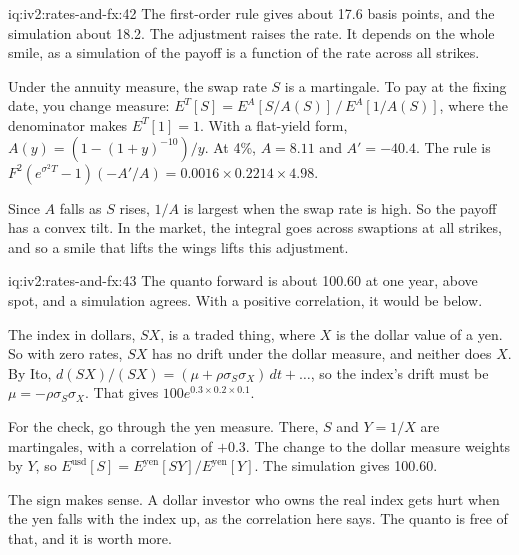 \begin{solution}{iq:iv2:rates-and-fx:42}
The first-order rule gives about 17.6 basis points, and the simulation about 18.2. The adjustment raises the rate. It depends on the whole smile, as a simulation of the payoff is a function of the rate across all strikes.

Under the annuity measure, the swap rate $S$ is a martingale. To pay at the fixing date, you change measure: $E^T[S] = E^A[S/A(S)]\,/\,E^A[1/A(S)]$, where the denominator makes $E^T[1] = 1$. With a flat-yield form, $A(y) = (1 - (1 + y)^{-10})/y$. At 4\%, $A = 8.11$ and $A' = -40.4$. The rule is $F^2(e^{\sigma^2T} - 1)(-A'/A) = 0.0016 \times 0.2214 \times 4.98$.

Since $A$ falls as $S$ rises, $1/A$ is largest when the swap rate is high. So the payoff has a convex tilt. In the market, the integral goes across swaptions at all strikes, and so a smile that lifts the wings lifts this adjustment.

\end{solution}

\begin{solution}{iq:iv2:rates-and-fx:43}
The quanto forward is about 100.60 at one year, above spot, and a simulation agrees. With a positive correlation, it would be below.

The index in dollars, $SX$, is a traded thing, where $X$ is the dollar value of a yen. So with zero rates, $SX$ has no drift under the dollar measure, and neither does $X$. By Ito, $d(SX)/(SX) = (\mu + \rho\sigma_S\sigma_X)\,dt + \ldots$, so the index's drift must be $\mu = -\rho\sigma_S\sigma_X$. That gives $100e^{0.3 \times 0.2 \times 0.1}$.

For the check, go through the yen measure. There, $S$ and $Y = 1/X$ are martingales, with a correlation of $+0.3$. The change to the dollar measure weights by $Y$, so $E^{\text{usd}}[S] = E^{\text{yen}}[SY]/E^{\text{yen}}[Y]$. The simulation gives 100.60.

The sign makes sense. A dollar investor who owns the real index gets hurt when the yen falls with the index up, as the correlation here says. The quanto is free of that, and it is worth more.

\end{solution}

